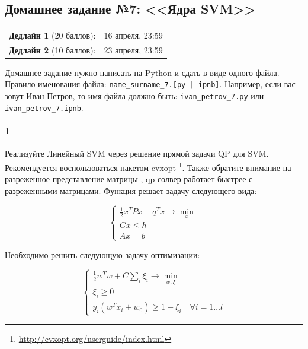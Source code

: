 \documentclass[a4paper,12pt]{article}
\begin{document}
\subsection*{Домашнее задание №7: <<Ядра SVM>>}

\begin{tabular}{@{}lr}
  \textbf{Дедлайн 1} (20 баллов): & 16 апреля, 23:59 \\
  \textbf{Дедлайн 2} (10 баллов): & 23 апреля, 23:59
\end{tabular}

Домашнее задание нужно написать на Python и сдать в виде одного файла.
Правило именования файла: \texttt{name\_surname\_7.[py | ipnb]}. Например, если
вас зовут Иван Петров, то имя файла должно быть: \texttt{ivan\_petrov\_7.py} или \texttt{ivan\_petrov\_7.ipnb}.

\makebox[\linewidth]{\hrulefill}

\paragraph{1} Реализуйте Линейный SVM через решение прямой задачи QP для SVM. Рекомендуется воспользоваться пакетом cvxopt \footnote{\url{http://cvxopt.org/userguide/index.html}}. Также обратите внимание на разреженное представление матрицы  , qp-солвер работает быстрее с разреженными матрицами.
Функция  решает задачу следующего вида:


\begin{equation*}
  \begin{cases}
    \frac{1}{2} x^T P x + q^T x \to \min\limits_{x} \\
    Gx \le h \\
    Ax = b
  \end{cases}
\end{equation*}

Необходимо решить следующую задачу оптимизации:

\begin{equation*}
  \begin{cases}
    \frac{1}{2} w^T w + C\sum\limits_{i} \xi_i \to \min\limits_{w, \xi} \\    
    \xi_i \ge 0 \\
    y_i (w^T x_i + w_0) \ge 1 - \xi_i \quad \forall i = 1\dots l
  \end{cases}
\end{equation*}
\end{document}

